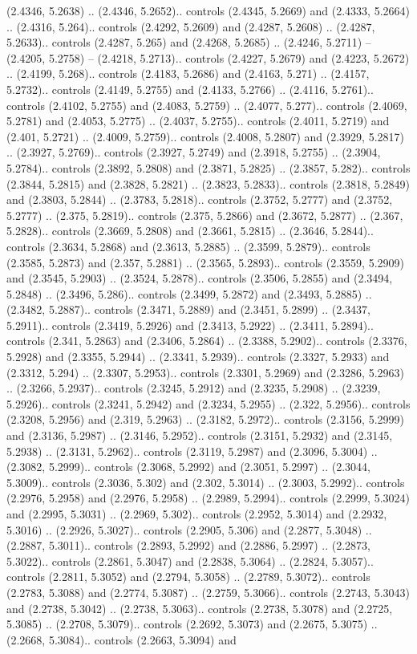 (2.4346, 5.2638) .. (2.4346, 5.2652).. controls (2.4345, 5.2669) and (2.4333, 5.2664) .. (2.4316, 5.264).. controls (2.4292, 5.2609) and (2.4287, 5.2608) .. (2.4287, 5.2633).. controls (2.4287, 5.265) and (2.4268, 5.2685) .. (2.4246, 5.2711) -- (2.4205, 5.2758) -- (2.4218, 5.2713).. controls (2.4227, 5.2679) and (2.4223, 5.2672) .. (2.4199, 5.268).. controls (2.4183, 5.2686) and (2.4163, 5.271) .. (2.4157, 5.2732).. controls (2.4149, 5.2755) and (2.4133, 5.2766) .. (2.4116, 5.2761).. controls (2.4102, 5.2755) and (2.4083, 5.2759) .. (2.4077, 5.277).. controls (2.4069, 5.2781) and (2.4053, 5.2775) .. (2.4037, 5.2755).. controls (2.4011, 5.2719) and (2.401, 5.2721) .. (2.4009, 5.2759).. controls (2.4008, 5.2807) and (2.3929, 5.2817) .. (2.3927, 5.2769).. controls (2.3927, 5.2749) and (2.3918, 5.2755) .. (2.3904, 5.2784).. controls (2.3892, 5.2808) and (2.3871, 5.2825) .. (2.3857, 5.282).. controls (2.3844, 5.2815) and (2.3828, 5.2821) .. (2.3823, 5.2833).. controls (2.3818, 5.2849) and (2.3803, 5.2844) .. (2.3783, 5.2818).. controls (2.3752, 5.2777) and (2.3752, 5.2777) .. (2.375, 5.2819).. controls (2.375, 5.2866) and (2.3672, 5.2877) .. (2.367, 5.2828).. controls (2.3669, 5.2808) and (2.3661, 5.2815) .. (2.3646, 5.2844).. controls (2.3634, 5.2868) and (2.3613, 5.2885) .. (2.3599, 5.2879).. controls (2.3585, 5.2873) and (2.357, 5.2881) .. (2.3565, 5.2893).. controls (2.3559, 5.2909) and (2.3545, 5.2903) .. (2.3524, 5.2878).. controls (2.3506, 5.2855) and (2.3494, 5.2848) .. (2.3496, 5.286).. controls (2.3499, 5.2872) and (2.3493, 5.2885) .. (2.3482, 5.2887).. controls (2.3471, 5.2889) and (2.3451, 5.2899) .. (2.3437, 5.2911).. controls (2.3419, 5.2926) and (2.3413, 5.2922) .. (2.3411, 5.2894).. controls (2.341, 5.2863) and (2.3406, 5.2864) .. (2.3388, 5.2902).. controls (2.3376, 5.2928) and (2.3355, 5.2944) .. (2.3341, 5.2939).. controls (2.3327, 5.2933) and (2.3312, 5.294) .. (2.3307, 5.2953).. controls (2.3301, 5.2969) and (2.3286, 5.2963) .. (2.3266, 5.2937).. controls (2.3245, 5.2912) and (2.3235, 5.2908) .. (2.3239, 5.2926).. controls (2.3241, 5.2942) and (2.3234, 5.2955) .. (2.322, 5.2956).. controls (2.3208, 5.2956) and (2.319, 5.2963) .. (2.3182, 5.2972).. controls (2.3156, 5.2999) and (2.3136, 5.2987) .. (2.3146, 5.2952).. controls (2.3151, 5.2932) and (2.3145, 5.2938) .. (2.3131, 5.2962).. controls (2.3119, 5.2987) and (2.3096, 5.3004) .. (2.3082, 5.2999).. controls (2.3068, 5.2992) and (2.3051, 5.2997) .. (2.3044, 5.3009).. controls (2.3036, 5.302) and (2.302, 5.3014) .. (2.3003, 5.2992).. controls (2.2976, 5.2958) and (2.2976, 5.2958) .. (2.2989, 5.2994).. controls (2.2999, 5.3024) and (2.2995, 5.3031) .. (2.2969, 5.302).. controls (2.2952, 5.3014) and (2.2932, 5.3016) .. (2.2926, 5.3027).. controls (2.2905, 5.306) and (2.2877, 5.3048) .. (2.2887, 5.3011).. controls (2.2893, 5.2992) and (2.2886, 5.2997) .. (2.2873, 5.3022).. controls (2.2861, 5.3047) and (2.2838, 5.3064) .. (2.2824, 5.3057).. controls (2.2811, 5.3052) and (2.2794, 5.3058) .. (2.2789, 5.3072).. controls (2.2783, 5.3088) and (2.2774, 5.3087) .. (2.2759, 5.3066).. controls (2.2743, 5.3043) and (2.2738, 5.3042) .. (2.2738, 5.3063).. controls (2.2738, 5.3078) and (2.2725, 5.3085) .. (2.2708, 5.3079).. controls (2.2692, 5.3073) and (2.2675, 5.3075) .. (2.2668, 5.3084).. controls (2.2663, 5.3094) and 